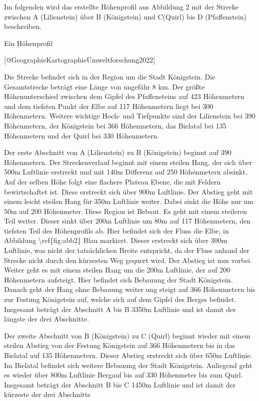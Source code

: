 Im folgenden wird das erstellte Höhenprofil aus Abbildung 2 mit der Strecke zwischen A (Lilienstein) über B (Königstein) und C(Quirl) bis D (Pfaffenstein) beschreiben.

Ein Höhenprofil

[@GeographieKartographieUmweltforschung2022]

Die Strecke befindet sich in der Region um die Stadt Königstein. Die Gesamtstrecke beträgt eine Länge von ungefähr 8 km. Der größte Höhenunterschied zwischen dem Gipfel des Pfaffensteins auf 423 Höhenmetern und dem tiefsten Punkt der Elbe auf 117 Höhenmetern liegt bei 300 Höhenmetern. Weitere wichtige Hoch- und Tiefpunkte sind der Lilienstein bei 390 Höhenmetern, der Königstein bei 366 Höhenmetern, das Bielatal bei 135 Höhenmetern und der Quirl bei 330 Höhenmetern.

Der erste Abschnitt von A (Lilienstein) zu B (Königstein) beginnt auf 390 Höhenmetern. Der Streckenverlauf beginnt mit einem steilen Hang, der sich über 500m Luftlinie erstreckt und mit 140m Differenz auf 250 Höhenmetern absinkt. Auf der selben Höhe folgt eine flachere Plateau Ebene, die mit Feldern bewirtschaftet ist. Diese erstreckt sich über 900m Luftlinie. Der Abstieg geht mit einem leicht steilen Hang für 350m Luftlinie weiter. Dabei sinkt die Höhe nur um 50m auf 200 Höhenmeter. Diese Region ist Bebaut. Es geht mit einem steileren Teil weiter. Dieser sinkt über 200m Luftlinie um 80m auf 117 Höhenmetern, den tiefsten Teil des Höhenprofils ab. Hier befindet sich der Fluss die Elbe, in Abbildung \textbackslash{}ref\{fig:abb2\} Blau markiert. Dieser erstreckt sich über 300m Luftlinie, was nicht der tatsächlichen Breite entspricht, da der Fluss anhand der Strecke nicht durch den kürzesten Weg gequert wird.  Der Abstieg ist nun vorbei. Weiter geht es mit einem steilen Hang um die 200m Luftlinie, der auf 200 Höhenmetern aufsteigt. Hier befindet sich Bebauung der Stadt Königstein. Danach geht der Hang ohne Bebauung weiter ung steigt auf 366 Höhenmetern bis zur Festung Königstein auf, welche sich auf dem Gipfel des Berges befindet. Insgesamt beträgt der Abschnitt A bis B 3350m Luftlinie und ist damit der längste der drei Abschnitte.

Der zweite Abschnitt von B (Königstein) zu C (Quirl) beginnt wieder mit einem steilen Abstieg von der Festung Königstein auf 366 Höhenmetern bis in das Bielatal auf 135 Höhenmetern. Dieser Abstieg erstreckt sich über 650m Luftlinie. Im Bielatal befindet sich weitere Bebauung der Stadt Königstein. Anliegend geht es wieder über 800m Luftlinie Bergauf bis auf 330 Höhenmeter bis zum Quirl. Insgesamt beträgt der Abschnitt B bis C 1450m Luftlinie und ist damit der kürzeste der drei Abschnitte

